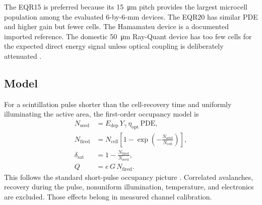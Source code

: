 \documentclass[10pt,letterpaper]{article}
\begin{document}
The EQR15 is preferred because its \SI{15}{\micro\meter} pitch provides the largest microcell
population among the evaluated 6-by-6-mm devices. The EQR20 has similar PDE and higher gain
but fewer cells. The Hamamatsu device is a documented imported reference. The domestic
\SI{50}{\micro\meter} Ray-Quant device has too few cells for the expected direct energy
signal unless optical coupling is deliberately attenuated
\cite{centao_eqr15,centao_eqr20,hamamatsu_s13360,rayquant_jsp}.

\subsection{Model}

For a scintillation pulse shorter than the cell-recovery time and uniformly illuminating the
active area, the first-order occupancy model is
\begin{align}
  N_{\mathrm{seed}} &=
    E_{\mathrm{dep}}\,Y_{\gamma}\,\eta_{\mathrm{opt}}\,\mathrm{PDE}, \\
  N_{\mathrm{fired}} &=
    N_{\mathrm{cell}}
    \left[1-\exp\left(-\frac{N_{\mathrm{seed}}}{N_{\mathrm{cell}}}\right)\right], \\
  \delta_{\mathrm{sat}} &=
    1-\frac{N_{\mathrm{fired}}}{N_{\mathrm{seed}}}, \\
  Q &= e\,G\,N_{\mathrm{fired}}.
\end{align}
This follows the standard short-pulse occupancy picture
\cite{hamamatsu_occupancy}. Correlated avalanches, recovery during the pulse, nonuniform
illumination, temperature, and electronics are excluded. Those effects belong in measured
channel calibration.
\end{document}

